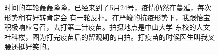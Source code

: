 \documentclass[cn,11pt,chinese]{elegantbook}
\begin{document}
\begin{figure}
    \caption{时间的车轮轰轰隆隆，已经来到了5月24号，疫情仍然在蔓延，每次形势稍有好转肯定会
    有一轮反扑。在严峻的抗疫形势下，我跟怡宝积极响应号召，去打第二针疫苗。拍摄地点是中山大学
    东校的人文社科楼，图为打完疫苗后的留观期的自拍。打疫苗的时候医生叫我叉腰还挺好笑的。}
\end{figure}
\end{document}
